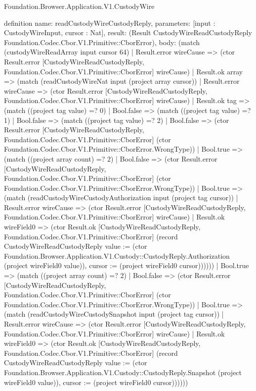 \begin{lexlean}{Foundation.Browser.Application.V1.CustodyWire}
\begin{semanticmodule}
definition{
  name: readCustodyWireCustodyReply,
  parameters: [input : CustodyWireInput, cursor : Nat],
  result: (Result CustodyWireReadCustodyReply Foundation.Codec.Cbor.V1.Primitive::CborError),
  body: (match (custodyWireReadArray input cursor 64)
    | Result.error wireCause => (ctor Result.error [CustodyWireReadCustodyReply, Foundation.Codec.Cbor.V1.Primitive::CborError] wireCause)
    | Result.ok array => (match (readCustodyWireNat input (project array cursor))
      | Result.error wireCause => (ctor Result.error [CustodyWireReadCustodyReply, Foundation.Codec.Cbor.V1.Primitive::CborError] wireCause)
      | Result.ok tag => (match ((project tag value) =? 0)
        | Bool.false => (match ((project tag value) =? 1)
          | Bool.false => (match ((project tag value) =? 2)
            | Bool.false => (ctor Result.error [CustodyWireReadCustodyReply, Foundation.Codec.Cbor.V1.Primitive::CborError] (ctor Foundation.Codec.Cbor.V1.Primitive::CborError.WrongType))
            | Bool.true => (match ((project array count) =? 2)
              | Bool.false => (ctor Result.error [CustodyWireReadCustodyReply, Foundation.Codec.Cbor.V1.Primitive::CborError] (ctor Foundation.Codec.Cbor.V1.Primitive::CborError.WrongType))
              | Bool.true => (match (readCustodyWireCustodyAuthorization input (project tag cursor))
                | Result.error wireCause => (ctor Result.error [CustodyWireReadCustodyReply, Foundation.Codec.Cbor.V1.Primitive::CborError] wireCause)
                | Result.ok wireField0 => (ctor Result.ok [CustodyWireReadCustodyReply, Foundation.Codec.Cbor.V1.Primitive::CborError] (record CustodyWireReadCustodyReply {value := (ctor Foundation.Browser.Application.V1.Custody::CustodyReply.Authorization (project wireField0 value)), cursor := (project wireField0 cursor)})))))
          | Bool.true => (match ((project array count) =? 2)
            | Bool.false => (ctor Result.error [CustodyWireReadCustodyReply, Foundation.Codec.Cbor.V1.Primitive::CborError] (ctor Foundation.Codec.Cbor.V1.Primitive::CborError.WrongType))
            | Bool.true => (match (readCustodyWireCustodySnapshot input (project tag cursor))
              | Result.error wireCause => (ctor Result.error [CustodyWireReadCustodyReply, Foundation.Codec.Cbor.V1.Primitive::CborError] wireCause)
              | Result.ok wireField0 => (ctor Result.ok [CustodyWireReadCustodyReply, Foundation.Codec.Cbor.V1.Primitive::CborError] (record CustodyWireReadCustodyReply {value := (ctor Foundation.Browser.Application.V1.Custody::CustodyReply.Snapshot (project wireField0 value)), cursor := (project wireField0 cursor)})))))
}
\end{semanticmodule}
\end{lexlean}
